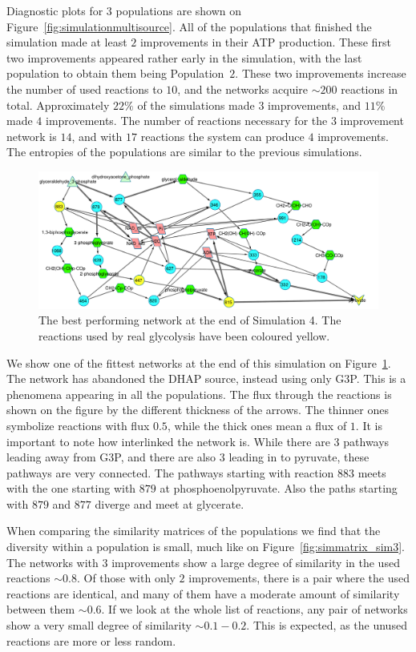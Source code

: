 \documentclass[a4paper,12pt]{article}
\begin{document}
Diagnostic plots for $3$ populations are shown on Figure~\ref{fig:simulationmultisource}. All of the populations that finished the simulation made at least $2$ improvements in their ATP production. These first two improvements appeared rather early in the simulation, with the last population to obtain them being Population~$2$. These two improvements increase the number of used reactions to $10$, and the networks acquire $\sim 200$ reactions in total.  Approximately $22\%$ of the simulations made $3$ improvements, and $11\%$ made $4$ improvements. The number of reactions necessary for the $3$ improvement network is $14$, and with $17$ reactions the system can produce $4$ improvements. The entropies of the populations are similar to the previous simulations. 



\begin{figure}[htpb]
	\centering
	\includegraphics[width=1\linewidth]{multisink_finalnet.pdf}
	\caption{The best performing network at the end of Simulation 4. The reactions used by real glycolysis have been coloured yellow. }
	\label{fig:multi}
\end{figure}

We show one of the fittest networks at the end of this simulation on Figure~\ref{fig:multi}. The network has abandoned the DHAP source, instead using only G3P. This is a phenomena appearing in all the populations. The flux through the reactions is shown on the figure by the different thickness of the arrows. The thinner ones symbolize reactions with flux $0.5$, while the thick ones mean a flux of $1$. It is important to note how interlinked the network is.  While there are 3 pathways leading away from G3P, and there are also $3$ leading in to pyruvate, these pathways are very connected. The pathways starting with reaction $883$ meets with the one starting with $879$ at phosphoenolpyruvate. Also the paths starting with $879$ and $877$  diverge and meet at glycerate. 

When comparing the similarity matrices of the populations we find that the diversity within a population is small, much like on Figure~\ref{fig:simmatrix_sim3}. The networks with $3$ improvements show a large degree of similarity in the used reactions $\sim 0.8$. Of those with only $2$ improvements, there is a pair where the used reactions are identical, and many of them have a moderate amount of similarity between them $\sim 0.6$. If we look at the whole list of reactions, any pair of networks show a very small degree of similarity $\sim 0.1-0.2$. This is expected, as the unused reactions are more or less random. 
\end{document}
